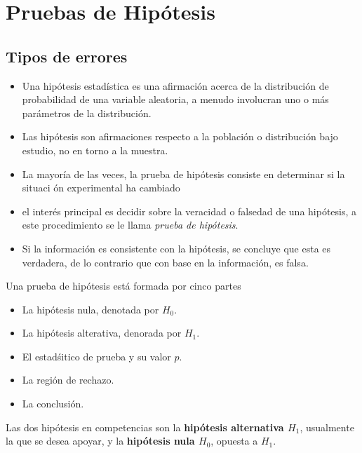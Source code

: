\section{Pruebas de Hip\'otesis}
\subsection*{Tipos de errores}

\begin{itemize}
\item Una hip\'otesis estad\'istica es una afirmaci\'on  acerca de la distribuci\'on de probabilidad de una variable aleatoria, a menudo involucran uno o m\'as par\'ametros de la distribuci\'on.

\item Las hip\'otesis son afirmaciones respecto a la poblaci\'on o distribuci\'on bajo estudio, no en torno a la muestra.

\item La mayor\'ia de las veces, la prueba de hip\'otesis consiste en determinar si la situaci \'on experimental ha cambiado

\item el inter\'es principal es decidir sobre la veracidad o falsedad de una hip\'otesis, a este procedimiento se le llama \textit{prueba de hip\'otesis}.

\item Si la informaci\'on es consistente con la hip\'otesis, se concluye que esta es verdadera, de lo contrario que con base en la informaci\'on, es falsa.
\end{itemize}

Una prueba de hip\'otesis est\'a formada por cinco partes
\begin{itemize}
\item La hip\'otesis nula, denotada por $H_{0}$.
\item La hip\'otesis alterativa, denorada por $H_{1}$.
\item El estad\'sitico de prueba y su valor $p$.
\item La regi\'on de rechazo.
\item La conclusi\'on.
\end{itemize}

\begin{Def}
Las dos hip\'otesis en competencias son la \textbf{hip\'otesis alternativa $H_{1}$}, usualmente la que se desea apoyar, y la \textbf{hip\'otesis nula $H_{0}$}, opuesta a $H_{1}$.
\end{Def}

